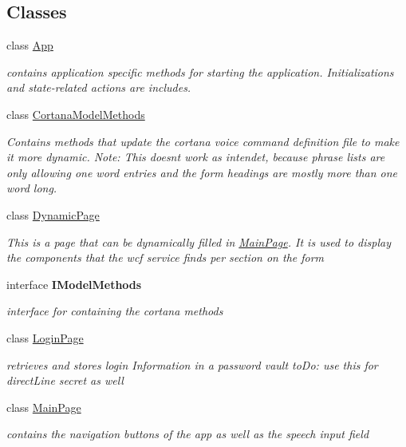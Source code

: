 \subsection*{Classes}
\begin{DoxyCompactItemize}
\item 
class \mbox{\hyperlink{class_listen_to_me_1_1_app}{App}}
\begin{DoxyCompactList}\small\item\em contains application specific methods for starting the application. Initializations and state-\/related actions are includes. \end{DoxyCompactList}\item 
class \mbox{\hyperlink{class_listen_to_me_1_1_cortana_model_methods}{Cortana\+Model\+Methods}}
\begin{DoxyCompactList}\small\item\em Contains methods that update the cortana voice command definition file to make it more dynamic. Note\+: This doesn\textquotesingle{}t work as intendet, because phrase lists are only allowing one word entries and the form headings are mostly more than one word long. \end{DoxyCompactList}\item 
class \mbox{\hyperlink{class_listen_to_me_1_1_dynamic_page}{Dynamic\+Page}}
\begin{DoxyCompactList}\small\item\em This is a page that can be dynamically filled in \mbox{\hyperlink{class_listen_to_me_1_1_main_page}{Main\+Page}}. It is used to display the components that the wcf service finds per section on the form \end{DoxyCompactList}\item 
interface {\bfseries I\+Model\+Methods}
\begin{DoxyCompactList}\small\item\em interface for containing the cortana methods \end{DoxyCompactList}\item 
class \mbox{\hyperlink{class_listen_to_me_1_1_login_page}{Login\+Page}}
\begin{DoxyCompactList}\small\item\em retrieves and stores login Information in a password vault to\+Do\+: use this for direct\+Line secret as well \end{DoxyCompactList}\item 
class \mbox{\hyperlink{class_listen_to_me_1_1_main_page}{Main\+Page}}
\begin{DoxyCompactList}\small\item\em contains the navigation buttons of the app as well as the speech input field \end{DoxyCompactList}\end{DoxyCompactItemize}
